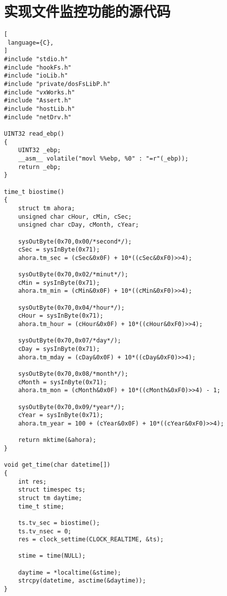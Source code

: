 \chapter{实现文件监控功能的源代码}
\label{hook}

\begin{lstlisting}[
 language={C},
]
#include "stdio.h"
#include "hookFs.h"
#include "ioLib.h"
#include "private/dosFsLibP.h"
#include "vxWorks.h"
#include "Assert.h"
#include "hostLib.h"
#include "netDrv.h"

UINT32 read_ebp()
{
	UINT32 _ebp;
	__asm__ volatile("movl %%ebp, %0" : "=r"(_ebp));
	return _ebp;
}

time_t biostime()   
{
	struct tm ahora;
	unsigned char cHour, cMin, cSec; 
	unsigned char cDay, cMonth, cYear; 
  
	sysOutByte(0x70,0x00/*second*/); 
	cSec = sysInByte(0x71); 
	ahora.tm_sec = (cSec&0x0F) + 10*((cSec&0xF0)>>4); 
  
	sysOutByte(0x70,0x02/*minut*/); 
	cMin = sysInByte(0x71); 
	ahora.tm_min = (cMin&0x0F) + 10*((cMin&0xF0)>>4); 
  
	sysOutByte(0x70,0x04/*hour*/); 
	cHour = sysInByte(0x71); 
	ahora.tm_hour = (cHour&0x0F) + 10*((cHour&0xF0)>>4); 
  
	sysOutByte(0x70,0x07/*day*/); 
	cDay = sysInByte(0x71); 
	ahora.tm_mday = (cDay&0x0F) + 10*((cDay&0xF0)>>4); 
  
	sysOutByte(0x70,0x08/*month*/); 
	cMonth = sysInByte(0x71); 
	ahora.tm_mon = (cMonth&0x0F) + 10*((cMonth&0xF0)>>4) - 1; 
  
	sysOutByte(0x70,0x09/*year*/); 
	cYear = sysInByte(0x71); 
	ahora.tm_year = 100 + (cYear&0x0F) + 10*((cYear&0xF0)>>4); 
  
	return mktime(&ahora); 
}

void get_time(char datetime[])
{
	int res; 
	struct timespec ts; 
	struct tm daytime; 
	time_t stime; 
  
	ts.tv_sec = biostime(); 
	ts.tv_nsec = 0; 
	res = clock_settime(CLOCK_REALTIME, &ts); 
	
	stime = time(NULL); 

	daytime = *localtime(&stime);
	strcpy(datetime, asctime(&daytime));
}


\end{lstlisting}
